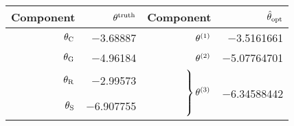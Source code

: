 \documentclass[../../Main_ManuscritThese.tex]{subfiles}
\begin{document}
\begin{table}[!h]
  \centering
  \begin{tabular}{rrrr}\toprule
   Component              & $\theta^{\mathrm{truth}}$                                                                                                                                                                                                                                                                      & Component                & $\hat{\theta}_{\mathrm{opt}}$                                              \\ \midrule
    $\theta_{\mathrm{C}}$    & \num[round-mode=places,round-precision=4]{-3.68887}                                                                                                                                                                                                                                         & $\theta^{(1)}$                  & \num[round-mode=places,round-precision=4]{-3.5161661}                   \\
    $\theta_{\mathrm{G}}$    & \num[round-mode=places,round-precision=4]{-4.96184}                                                                                                                                                                                                                                         & $\theta^{(2)}$                  & \num[round-mode=places,round-precision=4]{-5.07764701}                  \\
    $\theta_{\mathrm{R}}$    & \num[round-mode=places,round-precision=4]{-2.99573}                                                                                                                                                                                                                                         & \multirow{4}{*}{$\left. \vphantom{\begin{tabular}{c}3\\3\\3\\3\end{tabular}}\right\}\kk^{(3)}$} & \multirow{4}{*}{\num[round-mode=places,round-precision=4]{-6.34588442}} \\
    $\theta_{\mathrm{S}}$    & \num[round-mode=places,round-precision=4]{-6.907755}                                                                                                                                                                                                                                        &                          &                                                                         \\

\end{tabular}
\end{table}
\end{document}
